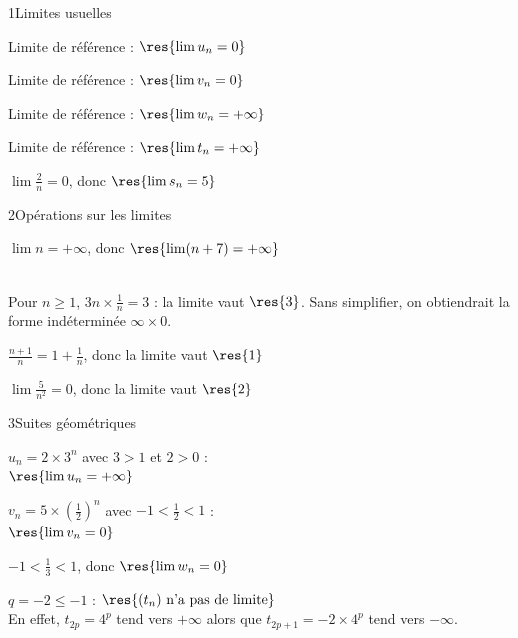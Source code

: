 

\begin{deuxcolonnes}

\begin{corrige}{1}{Limites usuelles}
\begin{questions}
  \item Limite de référence : $\res{\lim u_n=0}$
  \item Limite de référence : $\res{\lim v_n=0}$
  \item Limite de référence : $\res{\lim w_n=+\infty}$
  \item Limite de référence : $\res{\lim t_n=+\infty}$
  \item $\lim\frac{2}{n}=0$, donc $\res{\lim s_n=5}$
\end{questions}
\end{corrige}

\begin{corrige}{2}{Opérations sur les limites}
\begin{questions}
  \item $\lim n=+\infty$, donc $\res{\lim(n+7)=+\infty}$
  \item {}\\
    Pour $n\geq1$, $3n\times\frac{1}{n}=3$ : la limite vaut $\res{3}$. Sans simplifier, on obtiendrait la forme indéterminée $\infty\times0$.
  \item $\frac{n+1}{n}=1+\frac{1}{n}$, donc la limite vaut $\res{1}$
  \item $\lim\frac{5}{n^{2}}=0$, donc la limite vaut $\res{2}$
\end{questions}
\end{corrige}

\begin{corrige}{3}{Suites géométriques}
\begin{questions}
  \item $u_n=2\times3^{n}$ avec $3>1$ et $2>0$ :\\ $\res{\lim u_n=+\infty}$
  \item $v_n=5\times\left(\frac12\right)^{n}$ avec $-1<\frac12<1$ :\\ $\res{\lim v_n=0}$
  \item $-1<\frac13<1$, donc $\res{\lim w_n=0}$
  \item $q=-2\leq-1$ : $\res{(t_n)\text{ n'a pas de limite}}$\\
    En effet, $t_{2p}=4^{p}$ tend vers $+\infty$ alors que $t_{2p+1}=-2\times4^{p}$ tend vers $-\infty$.
\end{questions}
\end{corrige}


\end{deuxcolonnes}
